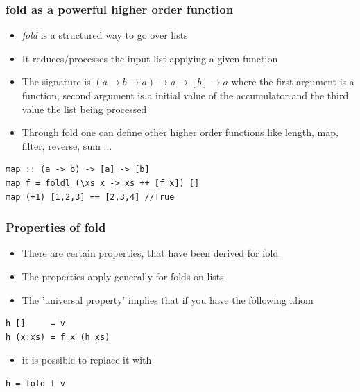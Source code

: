 \documentclass[10pt]{beamer}
\begin{document}
\begin{frame}[fragile]
\frametitle{fold as a powerful higher order function}
\begin{itemize}
\item \textit{fold} is a structured way to go over lists  	
\item It reduces/processes the input list applying a given function
\item The signature is $(a \rightarrow b \rightarrow a) \rightarrow  a \rightarrow  [b] \rightarrow a$ where the first argument is a
	function, second argument is a initial value of the accumulator and the third value the list being processed
\item Through fold one can define other higher order functions like length, map, filter, reverse, sum ...
\end{itemize}

\begin{lstlisting}
map :: (a -> b) -> [a] -> [b]
map f = foldl (\xs x -> xs ++ [f x]) [] 
map (+1) [1,2,3] == [2,3,4] //True
\end{lstlisting}

\end{frame}


\begin{frame}[fragile]
\frametitle{Properties of fold}
\begin{itemize}
\item There are certain properties, that have been derived for fold 
\item The properties apply generally for folds on lists 
\item The 'universal property' implies that if you have the following idiom   	
\end{itemize}

\begin{lstlisting}
h []     = v
h (x:xs) = f x (h xs)
\end{lstlisting}

\begin{itemize}
\item it is possible to replace it with
\end{itemize}

\begin{lstlisting}
h = fold f v
\end{lstlisting}

\end{frame}
\end{document}
